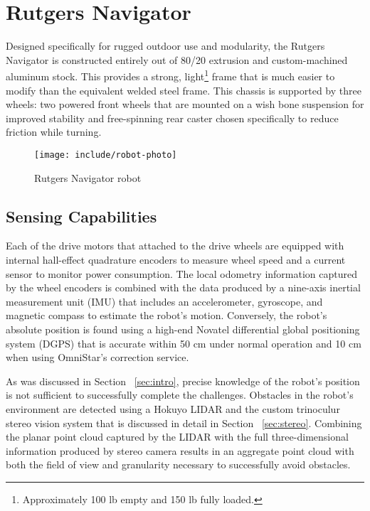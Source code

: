 \documentclass[twocolumn,11pt]{article}
\begin{document}
\section{Rutgers Navigator}
\label{sec:robot}
Designed specifically for rugged outdoor use and modularity, the Rutgers
Navigator is constructed entirely out of 80/20 extrusion and custom-machined
aluminum stock. This provides a strong, light\footnote{Approximately 100 lb
empty and 150 lb fully loaded.} frame that is much easier to modify than the
equivalent welded steel frame. This chassis is supported by three wheels: two
powered front wheels that are mounted on a wish bone suspension for improved
stability and free-spinning rear caster chosen specifically to reduce friction
while turning.

\begin{figure}
	\center
	\texttt{[image: include/robot-photo]}
	\caption{Rutgers Navigator robot}
	\label{fig:robot-photo}
\end{figure}

\subsection{Sensing Capabilities}
\label{sec:robot-sensors}
Each of the drive motors that attached to the drive wheels are equipped with
internal hall-effect quadrature encoders to measure wheel speed and a current
sensor to monitor power consumption. The local odometry information captured by
the wheel encoders is combined with the data produced by a nine-axis inertial
measurement unit (IMU) that includes an accelerometer, gyroscope, and magnetic
compass to estimate the robot's motion. Conversely, the robot's absolute
position is found using a high-end Novatel differential global positioning
system (DGPS) that is accurate within 50 cm under normal operation and 10 cm
when using OmniStar's correction service.

As was discussed in Section ~\ref{sec:intro}, precise knowledge of the robot's
position is not sufficient to successfully complete the challenges. Obstacles
in the robot's environment are detected using a Hokuyo LIDAR and the custom
trinoculur stereo vision system that is discussed in detail in Section
~\ref{sec:stereo}. Combining the planar point cloud captured by the LIDAR with
the full three-dimensional information produced by stereo camera results in an
aggregate point cloud with both the field of view and granularity necessary to
successfully avoid obstacles.
\end{document}
